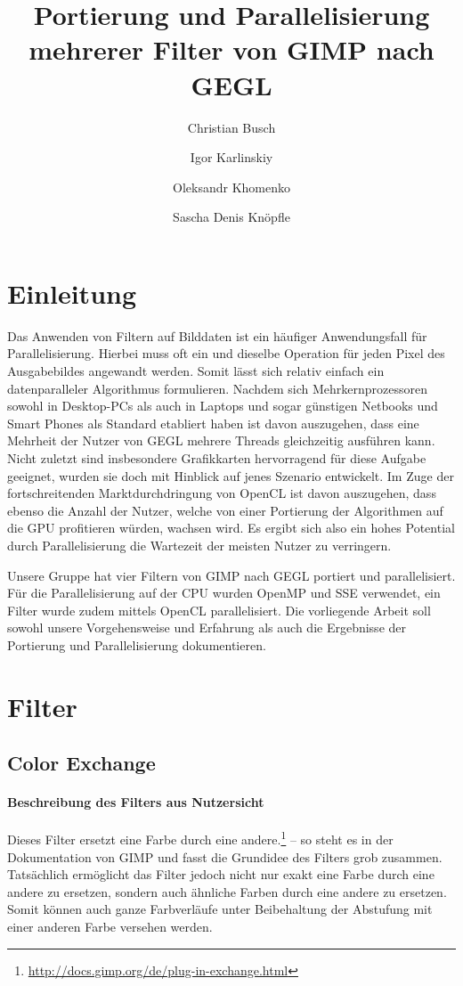 \documentclass[10pt,a4paper]{article}
\begin{document}
\author{Christian Busch
\and
Igor Karlinskiy
\and
Oleksandr Khomenko
\and
Sascha Denis Knöpfle
}
\title{Portierung und Parallelisierung mehrerer Filter von GIMP nach GEGL}
\maketitle

\section{Einleitung}
Das Anwenden von Filtern auf Bilddaten ist ein häufiger Anwendungsfall für Parallelisierung. Hierbei muss oft ein und dieselbe Operation für jeden Pixel des Ausgabebildes angewandt werden. Somit lässt sich relativ einfach ein datenparalleler Algorithmus formulieren. Nachdem sich Mehrkernprozessoren sowohl in Desktop-PCs als auch in Laptops und sogar günstigen Netbooks und Smart Phones als Standard etabliert haben ist davon auszugehen, dass eine Mehrheit der Nutzer von GEGL mehrere Threads gleichzeitig ausführen kann.  Nicht zuletzt sind insbesondere Grafikkarten hervorragend für diese Aufgabe geeignet, wurden sie doch mit Hinblick auf jenes Szenario entwickelt. Im Zuge der fortschreitenden Marktdurchdringung von OpenCL ist davon auszugehen, dass ebenso die Anzahl der Nutzer, welche von einer Portierung der Algorithmen auf die GPU profitieren würden, wachsen wird. Es ergibt sich also ein hohes Potential durch Parallelisierung die Wartezeit der meisten Nutzer zu verringern.

Unsere Gruppe hat vier Filtern von GIMP nach GEGL portiert und parallelisiert. Für die Parallelisierung auf der CPU wurden OpenMP und SSE verwendet, ein Filter wurde zudem mittels OpenCL parallelisiert.
Die vorliegende Arbeit soll sowohl unsere Vorgehensweise und Erfahrung als auch die Ergebnisse der Portierung und Parallelisierung dokumentieren. 

\section{Filter}
\subsection{Color Exchange}
\paragraph{Beschreibung des Filters aus Nutzersicht}
\glqq Dieses Filter ersetzt eine Farbe durch eine andere.\grqq\footnote{\url{http://docs.gimp.org/de/plug-in-exchange.html}} -- so steht es in der Dokumentation von GIMP und fasst die Grundidee des Filters grob zusammen. Tatsächlich ermöglicht das Filter jedoch nicht nur exakt eine Farbe durch eine andere zu ersetzen, sondern auch ähnliche Farben durch eine andere zu ersetzen. Somit können auch ganze Farbverläufe unter Beibehaltung der Abstufung mit einer anderen Farbe versehen werden.
\end{document}
